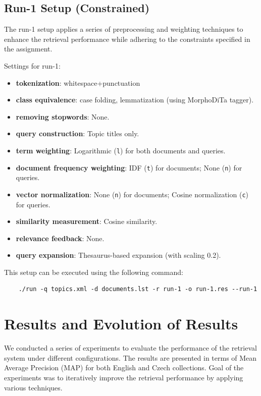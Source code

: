 \documentclass[a4paper, 12pt]{article}
\begin{document}
\subsection{Run-1 Setup (Constrained)}

The run-1 setup applies a series of preprocessing and weighting techniques to enhance the retrieval performance while adhering to the constraints specified in the assignment.

Settings for run-1:
\begin{itemize}
    \item \textbf{tokenization}: whitespace+punctuation
    \item \textbf{class equivalence}: case folding, lemmatization (using MorphoDiTa tagger).
    \item \textbf{removing stopwords}: None.
    \item \textbf{query construction}: Topic titles only.
    \item \textbf{term weighting}: Logarithmic (\texttt{l}) for both documents and queries.
    \item \textbf{document frequency weighting}: IDF (\texttt{t}) for documents; None (\texttt{n}) for queries.
    \item \textbf{vector normalization}: None (\texttt{n}) for documents; Cosine normalization (\texttt{c}) for queries.
    \item \textbf{similarity measurement}: Cosine similarity.
    \item \textbf{relevance feedback}: None.
    \item \textbf{query expansion}: Thesaurus-based expansion (with scaling 0.2). 
\end{itemize}

This setup can be executed using the following command:
\begin{verbatim}
    ./run -q topics.xml -d documents.lst -r run-1 -o run-1.res --run-1
\end{verbatim}


\section{Results and Evolution of Results}

We conducted a series of experiments to evaluate the performance of the retrieval system under different configurations.
The results are presented in terms of Mean Average Precision (MAP) for both English and Czech collections.
Goal of the experiments was to iteratively improve the retrieval performance by applying various techniques.
\end{document}
